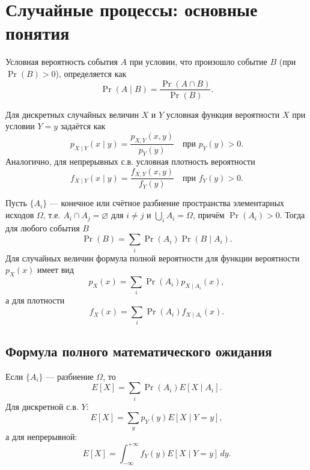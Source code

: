\documentclass[10pt]{article}
\begin{document}
\section{Случайные процессы: основные понятия}

\begin{definition}
Условная вероятность события $A$ при условии, что произошло событие $B$ (при $\Pr(B)>0$), определяется как
\[
\Pr(A \mid B) = \frac{\Pr(A \cap B)}{\Pr(B)}.
\]
\end{definition}

Для дискретных случайных величин $X$ и $Y$ условная функция вероятности $X$ при условии $Y=y$ задаётся как
\[
p_{X\mid Y}(x \mid y) = \frac{p_{X,Y}(x,y)}{p_Y(y)} \quad \text{при } p_Y(y)>0.
\]
Аналогично, для непрерывных с.в. условная плотность вероятности
\[
f_{X\mid Y}(x \mid y) = \frac{f_{X,Y}(x,y)}{f_Y(y)} \quad \text{при } f_Y(y)>0.
\]

\begin{theorem}
Пусть $\{A_i\}$ — конечное или счётное разбиение пространства элементарных исходов $\Omega$, т.е. $A_i \cap A_j = \varnothing$ для $i\ne j$ и $\bigcup_i A_i = \Omega$, причём $\Pr(A_i)>0$. Тогда для любого события $B$
\[
\Pr(B) = \sum_i \Pr(A_i) \Pr(B \mid A_i).
\]
Для случайных величин формула полной вероятности для функции вероятности $p_X(x)$ имеет вид
\[
p_X(x) = \sum_i \Pr(A_i) p_{X\mid A_i}(x),
\]
а для плотности
\[
f_X(x) = \sum_i \Pr(A_i) f_{X\mid A_i}(x).
\]
\end{theorem}

\subsection*{Формула полного математического ожидания}
Если $\{A_i\}$ — разбиение $\Omega$, то
\[
E[X] = \sum_i \Pr(A_i) E[X \mid A_i].
\]
Для дискретной с.в. $Y$:
\[
E[X] = \sum_y p_Y(y) E[X \mid Y=y],
\]
а для непрерывной:
\[
E[X] = \int_{-\infty}^{+\infty} f_Y(y) E[X \mid Y=y]\,dy.
\]
\end{document}
